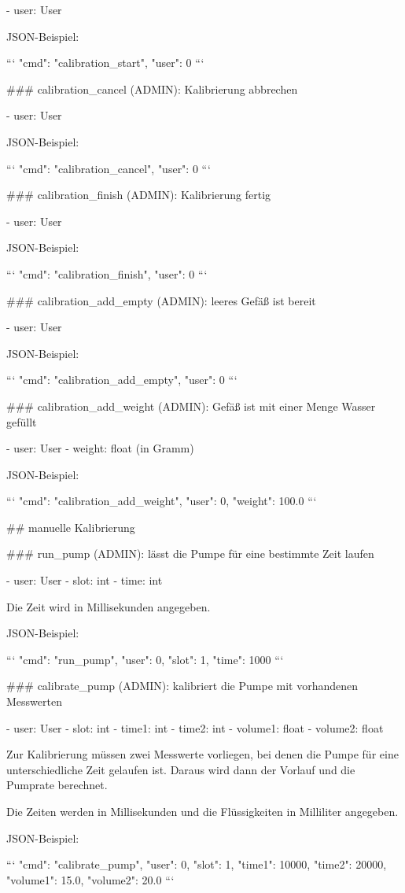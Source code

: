 - user: User

JSON-Beispiel:

```
{"cmd": "calibration_start", "user": 0}
```

### calibration_cancel (ADMIN): Kalibrierung abbrechen

- user: User

JSON-Beispiel:

```
{"cmd": "calibration_cancel", "user": 0}
```

### calibration_finish (ADMIN): Kalibrierung fertig

- user: User

JSON-Beispiel:

```
{"cmd": "calibration_finish", "user": 0}
```

### calibration_add_empty (ADMIN): leeres Gefäß ist bereit

- user: User

JSON-Beispiel:

```
{"cmd": "calibration_add_empty", "user": 0}
```

### calibration_add_weight (ADMIN): Gefäß ist mit einer Menge Wasser gefüllt

- user: User
- weight: float (in Gramm)

JSON-Beispiel:

```
{"cmd": "calibration_add_weight", "user": 0, "weight": 100.0}
```

## manuelle Kalibrierung

### run_pump (ADMIN): lässt die Pumpe für eine bestimmte Zeit laufen

- user: User
- slot: int
- time: int

Die Zeit wird in Millisekunden angegeben.

JSON-Beispiel:

```
{"cmd": "run_pump", "user": 0, "slot": 1, "time": 1000}
```

### calibrate_pump (ADMIN): kalibriert die Pumpe mit vorhandenen Messwerten

- user: User
- slot: int
- time1: int
- time2: int
- volume1: float
- volume2: float

Zur Kalibrierung müssen zwei Messwerte vorliegen, bei denen die Pumpe für eine unterschiedliche Zeit gelaufen ist. Daraus wird dann der Vorlauf und die Pumprate berechnet.

Die Zeiten werden in Millisekunden und die Flüssigkeiten in Milliliter angegeben.

JSON-Beispiel:

```
{"cmd": "calibrate_pump", "user": 0, "slot": 1, "time1": 10000, "time2": 20000, "volume1": 15.0, "volume2": 20.0}
```

